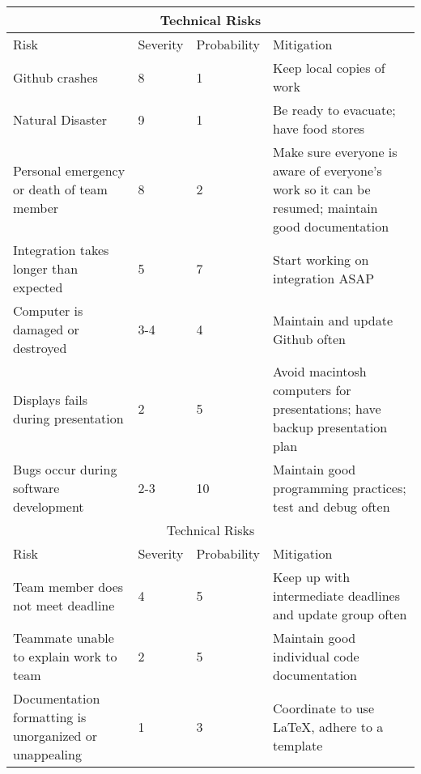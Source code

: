 \documentclass{scrreprt}
\begin{document}
\begin{tabular}{ |p{4cm}||p{2cm}|p{2cm}|p{4cm}|  }
    \hline
    \multicolumn{4}{|c|}{Technical Risks} \\
    \hline
    Risk & Severity & Probability & Mitigation\\
    \hline
    \hline
    Github crashes & 8 & 1 & Keep local copies of work\\
    \hline
    Natural Disaster & 9 & 1 & Be ready to evacuate; have food stores\\
    \hline
    Personal emergency or death of team member & 8 & 2 & Make sure everyone is aware of everyone's work so it can be resumed; maintain good documentation\\
    \hline
    Integration takes longer than expected & 5 & 7 & Start working on integration ASAP\\
    \hline
    Computer is damaged or destroyed & 3-4 & 4 & Maintain and update Github often\\
    \hline
    Displays fails during presentation & 2 & 5 & Avoid macintosh computers for presentations; have backup presentation plan\\
    \hline
    Bugs occur during software development & 2-3 & 10 & Maintain good programming practices; test and debug often\\
    \hline
    \hline
    \hline
    \multicolumn{4}{|c|}{Technical Risks} \\
    \hline
    Risk & Severity & Probability & Mitigation\\
    \hline
    \hline
    Team member does not meet deadline & 4 & 5 & Keep up with intermediate deadlines and update group often\\
    \hline
    Teammate unable to explain work to team & 2 & 5 & Maintain good individual code documentation\\
    \hline
    Documentation formatting is unorganized or unappealing & 1 & 3 & Coordinate to use LaTeX, adhere to a template\\
    \hline
\end{tabular}
\end{document}
